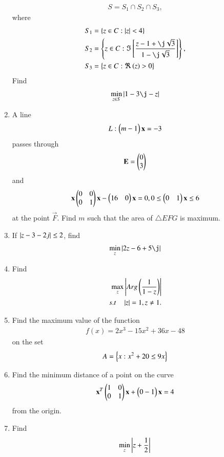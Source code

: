 \begin{enumerate}[label=\arabic*.,ref=\thesubsection.\theenumi]
\begin{align}
S = S_1\cap S_2\cap S_3,
\end{align}
%
where
\begin{align}
S_1 &= \cbrak{z\in C: \abs{z}< 4}
\\
S_2 &= \cbrak{z\in C: \Im\sbrak{\frac{z-1+\j\sqrt{3}}{1-\j\sqrt{3}}}},
\\
S_3 &= \cbrak{z\in C: \Re\brak{z} > 0}
\end{align}
Find
\begin{align}
\min_{z\in S}\abs{1-3\j-z}
\end{align}
\item A line 
\begin{align}
L: \begin{pmatrix}m -1\end{pmatrix}\mathbf{x} = -3
\end{align}
passes through
\begin{align}
\mathbf{E} = \begin{pmatrix}0\\3\end{pmatrix}
\end{align}
and 
\begin{align}
\mathbf{x}\begin{pmatrix}0 & 0 \\ 0 & 1\end{pmatrix}\mathbf{x} - \begin{pmatrix}16 & 0\end{pmatrix}\mathbf{x} = 0, 0 \le \begin{pmatrix}0 & 1\end{pmatrix}\mathbf{x} \le 6
\end{align}
%
at the point $\vec{F}$.  Find $m$ such that the area of $\triangle EFG$ is maximum.
\item If $\left\vert z-3-2j\right\vert \le 2$, find
\begin{align}
\min_{z}\abs{2z-6+5\j}
\end{align}
\item Find 
\begin{align}
\max_{z}\left\vert Arg\left(\frac{1}{1-z}\right)\right\vert
\\
s.t\quad \left\vert z\right\vert = 1, z \ne 1.
\end{align}
\item Find the maximum value of the function 
\begin{align}
f(x) = 2x^3-15x^2+36x-48
\end{align}
on the set 
\begin{align}
A = \left\{x : x^2+20 \le 9x\right\}
\end{align}
\item Find the minimum distance of a point on the curve 
\begin{align}
\mathbf{x}^T\begin{pmatrix}1 & 0 \\ 0 & 1\end{pmatrix}\mathbf{x} + \begin{pmatrix}0 -1\end{pmatrix}\mathbf{x}=4
\end{align}
%
from the origin.
\item Find 
\begin{align}
\min_{z}\abs{z+\frac{1}{2}}

\end{align}
\end{enumerate}
